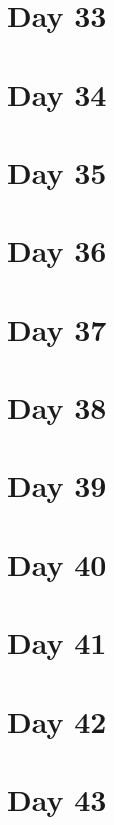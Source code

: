 \documentclass[]{book}
\begin{document}
\hypertarget{day-33}{%
\chapter{Day 33}\label{day-33}}

\hypertarget{day-34}{%
\chapter{Day 34}\label{day-34}}

\hypertarget{day-35}{%
\chapter{Day 35}\label{day-35}}

\hypertarget{day-36}{%
\chapter{Day 36}\label{day-36}}

\hypertarget{day-37}{%
\chapter{Day 37}\label{day-37}}

\hypertarget{day-38}{%
\chapter{Day 38}\label{day-38}}

\hypertarget{day-39}{%
\chapter{Day 39}\label{day-39}}

\hypertarget{day-40}{%
\chapter{Day 40}\label{day-40}}

\hypertarget{day-41}{%
\chapter{Day 41}\label{day-41}}

\hypertarget{day-42}{%
\chapter{Day 42}\label{day-42}}

\hypertarget{day-43}{%
\chapter{Day 43}\label{day-43}}


\end{document}
